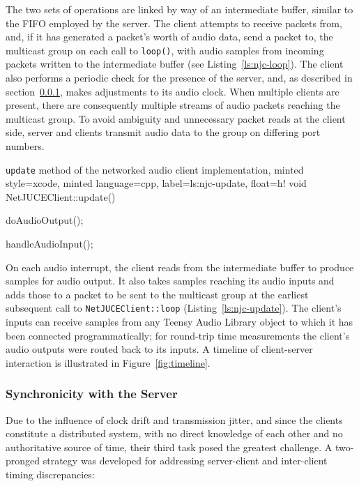 \documentclass[utf8]{FrontiersinHarvard}
\newcommand{\figref}[1]{Figure~\ref{#1}}
\newcommand{\secref}[1]{section~\ref{#1}}
\newcommand{\lstref}[1]{Listing~\ref{#1}}
\begin{document}
    The two sets of operations are linked by way of an intermediate buffer, similar
    to the FIFO employed by the server.
    The client attempts to receive packets from, and, if it has generated a packet's
    worth of audio data, send a packet to, the multicast group on each call to
    \texttt{loop()}, with audio samples from incoming packets written to the
    intermediate buffer (see \lstref{ls:njc-loop}).
    The client also performs a periodic check for the presence of the server, and,
    as described in \secref{subsubsec:client-sync}, makes adjustments to its audio
    clock.
    When multiple clients are present, there are consequently multiple streams of
    audio packets reaching the multicast group.
    To avoid ambiguity and unnecessary packet reads at the client side, server and
    clients transmit audio data to the group on differing port numbers.

    \begin{codelisting}{
        \texttt{update} method of the networked audio client implementation,
        minted style=xcode,
        minted language=cpp,
        label=ls:njc-update,
        float=h!
    }
        void NetJUCEClient::update() {
            doAudioOutput();

            handleAudioInput();
        }
    \end{codelisting}

    On each audio interrupt, the client reads from the intermediate buffer to
    produce samples for audio output.
    It also takes samples reaching its audio inputs and adds those to a packet to be
    sent to the multicast group at the earliest subsequent call to
    \texttt{NetJUCEClient::loop} (\lstref{ls:njc-update}).
    The client's inputs can receive samples from any Teensy Audio Library object to
    which it has been connected programmatically;
    for round-trip time measurements the client's audio outputs were routed back to
    its inputs.
    A timeline of client-server interaction is illustrated in \figref{fig:timeline}.

    \subsubsection{Synchronicity with the Server}\label{subsubsec:client-sync}

    Due to the influence of clock drift and transmission jitter, and since the
    clients constitute a distributed system, with no direct knowledge of each
    other and no authoritative source of time, their third task posed the
    greatest challenge.
    A two-pronged strategy was developed for addressing server-client and
    inter-client timing discrepancies:
\end{document}
